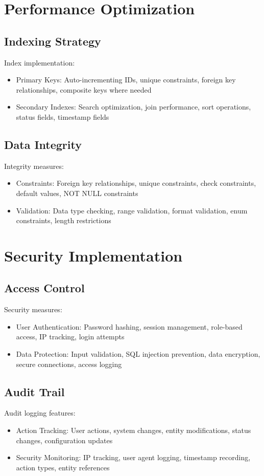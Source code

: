 \section{Performance Optimization}
\subsection{Indexing Strategy}
Index implementation:
\begin{itemize}
    \item Primary Keys: Auto-incrementing IDs, unique constraints, foreign key relationships, composite keys where needed
    \item Secondary Indexes: Search optimization, join performance, sort operations, status fields, timestamp fields
\end{itemize}

\subsection{Data Integrity}
Integrity measures:
\begin{itemize}
    \item Constraints: Foreign key relationships, unique constraints, check constraints, default values, NOT NULL constraints
    \item Validation: Data type checking, range validation, format validation, enum constraints, length restrictions
\end{itemize}

\section{Security Implementation}
\subsection{Access Control}
Security measures:
\begin{itemize}
    \item User Authentication: Password hashing, session management, role-based access, IP tracking, login attempts
    \item Data Protection: Input validation, SQL injection prevention, data encryption, secure connections, access logging
\end{itemize}

\subsection{Audit Trail}
Audit logging features:
\begin{itemize}
    \item Action Tracking: User actions, system changes, entity modifications, status changes, configuration updates
    \item Security Monitoring: IP tracking, user agent logging, timestamp recording, action types, entity references
\end{itemize} 